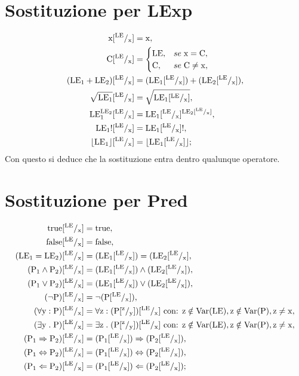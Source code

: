 \documentclass[a4paper, 12pt, oneside,fleqn]{book}
\begin{document}
\section{Sostituzione per LExp}
\begin{align*}
\idx[^{\LE}/_\idx] &= \idx,\\
\C[^{\LE}/_\idx] &= 
	\begin{cases}
		\LE, &se \hspace{1mm}\idx=\C,  \\
		\C, &se\hspace{1mm} \C\neq\idx, 
	\end{cases} \\
(\LE_1 + \LE_2)[^{\LE}/_\idx] &= (\LE_1[^{\LE}/_\idx]) + (\LE_2[^{\LE}/_\idx]),\\
\sqrt{\LE_1}[^{\LE}/_\idx] &= \sqrt{{\LE_1}[^{\LE}/_\idx]},\\
\LE_1^{\LE{_2}}[^{\LE}/_\idx] &=\LE_1[^{\LE}/_\idx]^{\LE{_2}[^{\LE}/_\idx]},\\
{\LE_1}![^{\LE}/_\idx] &= {{\LE_1}[^{\LE}/_\idx]}!,\\
\lfloor \LE_1 \rfloor[^{\LE}/_\idx] &= \lfloor \LE_1[^{\LE}/_\idx] \rfloor;\\
\end{align*}
Con questo si deduce che la sostituzione entra dentro qualunque operatore.
\section{Sostituzione per Pred}
\begin{align*}
\true[^{\LE}/_\idx] &= \true,\\
\false[^{\LE}/_\idx] &= \false,\\
(\LE{_1} = \LE{_2})[^{\LE}/_\idx] &= (\LE{_1}[^{\LE}/_\idx]) = (\LE{_2}[^{\LE}/_\idx], \\
(\p{_1} \wedge \p{_2})[^{\LE}/_\idx] &= (\LE{_1}[^{\LE}/_\idx]) \wedge (\LE{_2}[^{\LE}/_\idx]),\\
(\p{_1} \vee \p{_2})[^{\LE}/_\idx] &= (\LE{_1}[^{\LE}/_\idx]) \vee (\LE{_2}[^{\LE}/_\idx]), \\
(\neg \p)[^{\LE}/_\idx] &= \neg(\p[^{\LE}/_\idx]),\\
(\forall\y\itc \p)[^{\LE}/_\idx] &= \forall \mathrm{z}\itc (\p[^\mathrm{z}/_\y])[^{\LE}/_\idx] \text{ con: }\mathrm{z}\notin\Var(\LE), \mathrm{z}\notin\Var(\p),\mathrm{z}\neq\idx, \\
(\exists \y\st \p)[^{\LE}/_\idx] &= \exists \mathrm{z}\st (\p[^\mathrm{z}/_\y])[^{\LE}/_\idx] \text{ con: }\mathrm{z}\notin\Var(\LE), \mathrm{z}\notin\Var(\p),\mathrm{z}\neq\idx,\\
(\p{_1} \Rightarrow \p{_2})[^{\LE}/_\idx] &= (\p{_1}[^{\LE}/_\idx]) \Rightarrow (\p{_2}[^{\LE}/_\idx]), \\
(\p{_1} \Leftrightarrow \p{_2})[^{\LE}/_\idx] &= (\p{_1}[^{\LE}/_\idx]) \Leftrightarrow (\p{_2}[^{\LE}/_\idx]), \\
(\p{_1} \Leftarrow \p{_2})[^{\LE}/_\idx] &= (\p{_1}[^{\LE}/_\idx]) \Leftarrow (\p{_2}[^{\LE}/_\idx]);
\end{align*}
\end{document}

